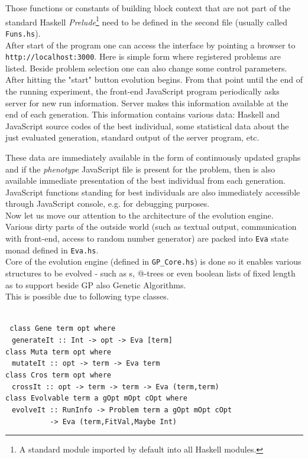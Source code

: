 \documentclass[12pt,a4paper]{report}
\makeatletter
\newcommand{\lets}{let us\xspace}
\newcommand{\atTree}{@-tree\xspace}
\makeatother
\begin{document}
Those functions or constants of building block context
that are not part of the standard Haskell \textit{Prelude}\footnote{
A standard module imported by default into all Haskell modules.}
need to be defined in the second file (usually called \texttt{Funs.hs}).\\

After start of the program one can access the interface
by pointing a browser to \texttt{http://localhost:3000}. Here is simple 
form where registered problems are listed. Beside problem selection
one can also change some control parameters. After hitting the "start"
button evolution begins. From that point until the end of the running
experiment, the front-end JavaScript program periodically asks
server for new run information. Server makes this information available 
at the end of each generation. This information contains various
data: Haskell and JavaScript source codes of the best individual,
some statistical data about the just evaluated generation,  
standard output of the server program, etc.

These data are immediately available in the form of
continuously updated graphs and if 
the \textit{phenotype} JavaScript file is present 
for the problem, then is also available immediate 
presentation of the best individual from each generation.
JavaScript functions standing for best individuals are 
also immediately accessible through JavaScript console,
e.g. for debugging purposes.\\  
  
Now \lets move our attention to the architecture of the evolution engine.
Various dirty parts of the outside world (such as textual output,
communication with front-end, access to random number generator) are  
packed into \texttt{Eva} state monad defined in \texttt{Eva.hs}.\\
  
Core of the evolution engine (defined in \texttt{GP\_{}Core.hs})
is done so it enables various structures
to be evolved - such as \sexprTree{}s, \atTree{}s or even boolean lists
of fixed length as to support beside GP also Genetic Algorithms.\\[1em]

This is possible due to following type classes. 
 
~\\\texttt{
class Gene term opt where\\
$~\;\;$generateIt :: Int -> opt -> Eva [term]\\[1em]
class Muta term opt where\\
$~\;\;$mutateIt :: opt -> term -> Eva term \\[1em]
class Cros term opt where\\
$~\;\;$crossIt :: opt -> term -> term -> Eva (term,term) \\[1em]
class Evolvable term a gOpt mOpt cOpt where\\
$~\;\;$evolveIt :: RunInfo -> Problem term a gOpt mOpt cOpt  \\
$~~~~~~~~~~~~~~~~~~~~~~$
-> Eva (term,FitVal,Maybe Int)
} ~\\
\end{document}
